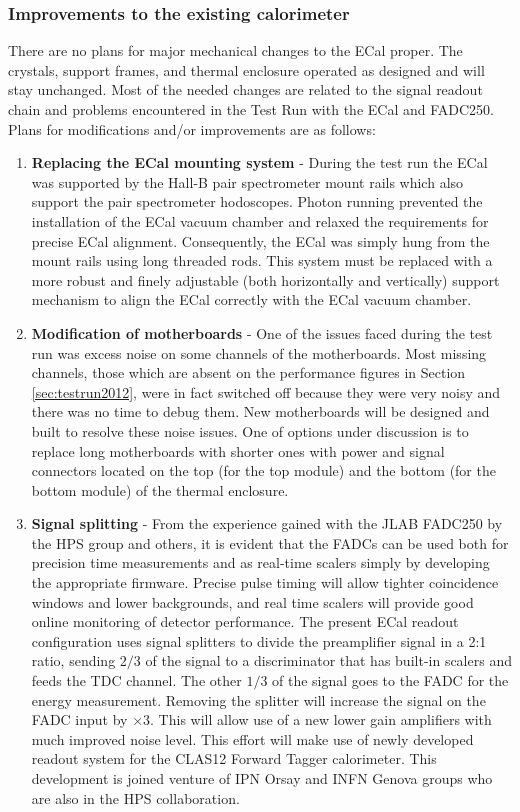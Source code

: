 \subsubsection{Improvements to the existing calorimeter}

There are no plans for major mechanical changes to the ECal proper. The crystals, support frames, and thermal enclosure operated as designed and will stay unchanged. Most of the needed changes are related to the signal readout chain and problems encountered in the Test Run with the ECal and FADC250. Plans for  
modifications and/or improvements are as follows: 

\begin{enumerate}
\item {\bf Replacing the ECal mounting system} - 
During the test run the ECal was supported by the Hall-B pair spectrometer mount rails which also support the pair spectrometer hodoscopes. 
Photon running prevented the installation of the ECal vacuum chamber and relaxed the requirements for precise ECal alignment. Consequently, the ECal was simply hung from the mount rails using  long threaded rods. This system must be replaced with a more robust and finely adjustable (both horizontally and vertically) support mechanism to  align the  ECal correctly with the ECal vacuum chamber.

\item {\bf Modification of motherboards} - One of the issues  faced during the test run was excess noise on some channels of the motherboards. 
Most missing channels, those which are absent on the performance figures in Section \ref{sec:testrun2012}, were in fact switched off because they were very noisy and there was no time to debug them. New motherboards will be designed and built to resolve these noise issues. One of options under discussion is to replace long motherboards with shorter ones with power and signal connectors 
located on the top (for the top module) and the bottom (for the bottom module) of the thermal enclosure. 

\item {\bf Signal splitting} - From the experience gained with the JLAB FADC250 by the HPS group and others, it is evident that the FADCs can be used both for precision time measurements and as 
real-time scalers simply by developing the appropriate firmware.
Precise pulse timing will allow tighter coincidence windows and lower backgrounds, and real time scalers will provide good online monitoring of detector performance. The present ECal readout configuration uses signal splitters to divide the preamplifier signal in  a 2:1 ratio, sending 
$2/3$ of the signal to a discriminator that has built-in scalers and feeds the TDC channel. The other $1/3$ of the 
signal goes to the FADC for the energy measurement. Removing the splitter will increase the signal on the FADC input by $\times 3$. This will allow use of a new lower gain amplifiers with much improved noise level. This effort will make use of newly developed readout system for the CLAS12 Forward Tagger calorimeter. This development is joined venture of IPN Orsay and INFN Genova groups who are also in the HPS collaboration.


\end{enumerate}
